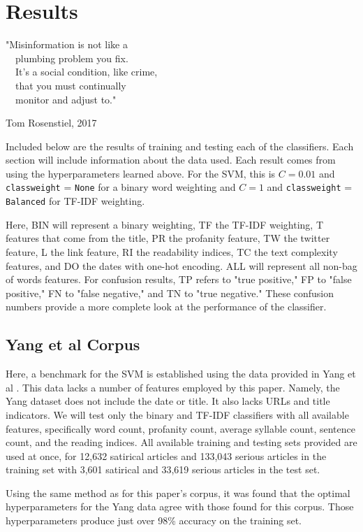 \documentclass [12 pt] {report}
\begin{document}
\chapter{Results}
\singlespacing
\epigraph{"Misinformation is not like a\\~~plumbing problem you fix.\\~~It's a social condition, like crime,\\~~that you must continually\\~~monitor and adjust to."}{Tom Rosenstiel, 2017}
\onehalfspacing
Included below are the results of training and testing each of the classifiers. Each section will include information about the data used. Each result comes from using the hyperparameters learned above. For the SVM, this is $C = 0.01$ and \texttt{class\textunderscore weight} = \texttt{None} for a binary word weighting and $C = 1$ and \texttt{class\textunderscore weight} = \texttt{Balanced} for TF-IDF weighting.

Here, BIN will represent a binary weighting, TF the TF-IDF weighting, T features that come from the title, PR the profanity feature, TW the twitter feature, L the link feature, RI the readability indices, TC the text complexity features, and DO the dates with one-hot encoding. ALL will represent all non-bag of words features. For confusion results, TP refers to "true positive," FP to "false positive," FN to "false negative," and TN to "true negative." These confusion numbers provide a more complete look at the performance of the classifier.

\section{Yang et al Corpus}
Here, a benchmark for the SVM is established using the data provided in Yang et al \cite{Yang}. This data lacks a number of features employed by this paper. Namely, the Yang dataset does not include the date or title. It also lacks URLs and title indicators. We will test only the binary and TF-IDF classifiers with all available features, specifically word count, profanity count, average syllable count, sentence count, and the reading indices. All available training and testing sets provided are used at once, for 12,632 satirical articles and 133,043 serious articles in the training set with 3,601 satirical and 33,619 serious articles in the test set.

Using the same method as for this paper's corpus, it was found that the optimal hyperparameters for the Yang data agree with those found for this corpus. Those hyperparameters produce just over 98\% accuracy on the training set.
\end{document}
